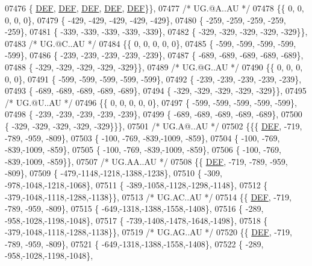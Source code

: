 \begin{DoxyCode}
07476 \{  \mbox{\hyperlink{1_88_84__epars_8h_a397419fc12b37ed479c8abb9d444d843}{DEF}},  \mbox{\hyperlink{1_88_84__epars_8h_a397419fc12b37ed479c8abb9d444d843}{DEF}},  \mbox{\hyperlink{1_88_84__epars_8h_a397419fc12b37ed479c8abb9d444d843}{DEF}},  \mbox{\hyperlink{1_88_84__epars_8h_a397419fc12b37ed479c8abb9d444d843}{DEF}},  \mbox{\hyperlink{1_88_84__epars_8h_a397419fc12b37ed479c8abb9d444d843}{DEF}}\}\},
07477 \textcolor{comment}{/* UG.@A..AU */}
07478 \{\{    0,    0,    0,    0,    0\},
07479 \{ -429, -429, -429, -429, -429\},
07480 \{ -259, -259, -259, -259, -259\},
07481 \{ -339, -339, -339, -339, -339\},
07482 \{ -329, -329, -329, -329, -329\}\},
07483 \textcolor{comment}{/* UG.@C..AU */}
07484 \{\{    0,    0,    0,    0,    0\},
07485 \{ -599, -599, -599, -599, -599\},
07486 \{ -239, -239, -239, -239, -239\},
07487 \{ -689, -689, -689, -689, -689\},
07488 \{ -329, -329, -329, -329, -329\}\},
07489 \textcolor{comment}{/* UG.@G..AU */}
07490 \{\{    0,    0,    0,    0,    0\},
07491 \{ -599, -599, -599, -599, -599\},
07492 \{ -239, -239, -239, -239, -239\},
07493 \{ -689, -689, -689, -689, -689\},
07494 \{ -329, -329, -329, -329, -329\}\},
07495 \textcolor{comment}{/* UG.@U..AU */}
07496 \{\{    0,    0,    0,    0,    0\},
07497 \{ -599, -599, -599, -599, -599\},
07498 \{ -239, -239, -239, -239, -239\},
07499 \{ -689, -689, -689, -689, -689\},
07500 \{ -329, -329, -329, -329, -329\}\}\},
07501 \textcolor{comment}{/* UG.A@..AU */}
07502 \{\{\{  \mbox{\hyperlink{1_88_84__epars_8h_a397419fc12b37ed479c8abb9d444d843}{DEF}}, -719, -789, -959, -809\},
07503 \{ -100, -769, -839,-1009, -859\},
07504 \{ -100, -769, -839,-1009, -859\},
07505 \{ -100, -769, -839,-1009, -859\},
07506 \{ -100, -769, -839,-1009, -859\}\},
07507 \textcolor{comment}{/* UG.AA..AU */}
07508 \{\{  \mbox{\hyperlink{1_88_84__epars_8h_a397419fc12b37ed479c8abb9d444d843}{DEF}}, -719, -789, -959, -809\},
07509 \{ -479,-1148,-1218,-1388,-1238\},
07510 \{ -309, -978,-1048,-1218,-1068\},
07511 \{ -389,-1058,-1128,-1298,-1148\},
07512 \{ -379,-1048,-1118,-1288,-1138\}\},
07513 \textcolor{comment}{/* UG.AC..AU */}
07514 \{\{  \mbox{\hyperlink{1_88_84__epars_8h_a397419fc12b37ed479c8abb9d444d843}{DEF}}, -719, -789, -959, -809\},
07515 \{ -649,-1318,-1388,-1558,-1408\},
07516 \{ -289, -958,-1028,-1198,-1048\},
07517 \{ -739,-1408,-1478,-1648,-1498\},
07518 \{ -379,-1048,-1118,-1288,-1138\}\},
07519 \textcolor{comment}{/* UG.AG..AU */}
07520 \{\{  \mbox{\hyperlink{1_88_84__epars_8h_a397419fc12b37ed479c8abb9d444d843}{DEF}}, -719, -789, -959, -809\},
07521 \{ -649,-1318,-1388,-1558,-1408\},
07522 \{ -289, -958,-1028,-1198,-1048\},

\end{DoxyCode}
